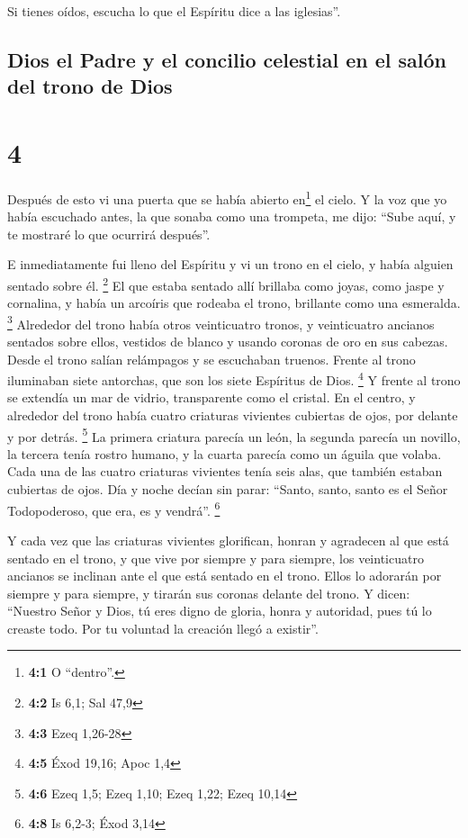  Si tienes oídos, escucha lo que el Espíritu dice a las
iglesias''.

\hypertarget{dios-el-padre-y-el-concilio-celestial-en-el-saluxf3n-del-trono-de-dios}{%
\subsection{Dios el Padre y el concilio celestial en el salón del trono
de
Dios}\label{dios-el-padre-y-el-concilio-celestial-en-el-saluxf3n-del-trono-de-dios}}

\hypertarget{section-3}{%
\section{4}\label{section-3}}

 Después de esto vi una puerta que se había abierto
en\footnote{\textbf{4:1} O ``dentro''.} el cielo. Y la voz que yo había
escuchado antes, la que sonaba como una trompeta, me dijo: ``Sube aquí,
y te mostraré lo que ocurrirá después''.

 E inmediatamente fui lleno del Espíritu y vi un trono en
el cielo, y había alguien sentado sobre él. \footnote{\textbf{4:2} Is
  6,1; Sal 47,9}  El que estaba sentado allí brillaba como
joyas, como jaspe y cornalina, y había un arcoíris que rodeaba el trono,
brillante como una esmeralda. \footnote{\textbf{4:3} Ezeq 1,26-28}
 Alrededor del trono había otros veinticuatro tronos, y
veinticuatro ancianos sentados sobre ellos, vestidos de blanco y usando
coronas de oro en sus cabezas.  Desde el trono salían
relámpagos y se escuchaban truenos. Frente al trono iluminaban siete
antorchas, que son los siete Espíritus de Dios. \footnote{\textbf{4:5}
  Éxod 19,16; Apoc 1,4}  Y frente al trono se extendía un
mar de vidrio, transparente como el cristal. En el centro, y alrededor
del trono había cuatro criaturas vivientes cubiertas de ojos, por
delante y por detrás. \footnote{\textbf{4:6} Ezeq 1,5; Ezeq 1,10; Ezeq
  1,22; Ezeq 10,14}  La primera criatura parecía un león,
la segunda parecía un novillo, la tercera tenía rostro humano, y la
cuarta parecía como un águila que volaba.  Cada una de las
cuatro criaturas vivientes tenía seis alas, que también estaban
cubiertas de ojos. Día y noche decían sin parar: ``Santo, santo, santo
es el Señor Todopoderoso, que era, es y vendrá''. \footnote{\textbf{4:8}
  Is 6,2-3; Éxod 3,14}

 Y cada vez que las criaturas vivientes glorifican, honran
y agradecen al que está sentado en el trono, y que vive por siempre y
para siempre,  los veinticuatro ancianos se inclinan ante
el que está sentado en el trono. Ellos lo adorarán por siempre y para
siempre, y tirarán sus coronas delante del trono. Y dicen:
 ``Nuestro Señor y Dios, tú eres digno de gloria, honra y
autoridad, pues tú lo creaste todo. Por tu voluntad la creación llegó a
existir''.


